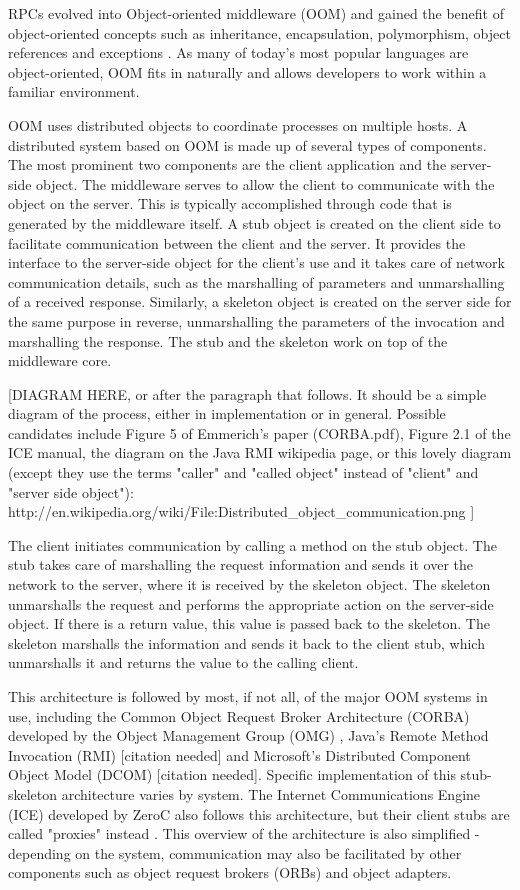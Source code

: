 \documentclass{acm_proc_article-sp}
\begin{document}
RPCs evolved into Object-oriented middleware (OOM) and gained the benefit of object-oriented concepts such as inheritance, encapsulation, polymorphism, object references and exceptions \cite{Pinus:2006p8367} \cite{Vinoski:2004p8371}.  As many of today's most popular languages are object-oriented, OOM fits in naturally and allows developers to work within a familiar environment.

OOM uses distributed objects to coordinate processes on multiple hosts.  A distributed system based on OOM is made up of several types of components.  The most prominent two components are the client application and the server-side object.  The middleware serves to allow the client to communicate with the object on the server.  This is typically accomplished through code that is generated by the middleware itself.  A stub object is created on the client side to facilitate communication between the client and the server.  It provides the interface to the server-side object for the client's use and it takes care of network communication details, such as the marshalling of parameters and unmarshalling of a received response.  Similarly, a skeleton object is created on the server side for the same purpose in reverse, unmarshalling the parameters of the invocation and marshalling the response.  The stub and the skeleton work on top of the middleware core.

[DIAGRAM HERE, or after the paragraph that follows.  It should be a simple diagram of the process, either in implementation or in general.  Possible candidates include Figure 5 of Emmerich's paper (CORBA.pdf), Figure 2.1 of the ICE manual, the diagram on the Java RMI wikipedia page, or this lovely diagram (except they use the terms "caller" and "called object" instead of "client" and "server side object"): http://en.wikipedia.org/wiki/File:Distributed_object_communication.png ]

The client initiates communication by calling a method on the stub object.  The stub takes care of marshalling the request information and sends it over the network to the server, where it is received by the skeleton object.  The skeleton unmarshalls the request and performs the appropriate action on the server-side object.  If there is a return value, this value is passed back to the skeleton.  The skeleton marshalls the information and sends it back to the client stub, which unmarshalls it and returns the value to the calling client.

This architecture is followed by most, if not all, of the major OOM systems in use, including the Common Object Request Broker Architecture (CORBA) developed by the Object Management Group (OMG) \cite{Emmerich:2007p8368}, Java's Remote Method Invocation (RMI) [citation needed] and Microsoft's Distributed Component Object Model (DCOM) [citation needed].  Specific implementation of this stub-skeleton architecture varies by system.  The Internet Communications Engine (ICE) developed by ZeroC also follows this architecture, but their client stubs are called "proxies" instead \cite{icemanual}.  This overview of the architecture is also simplified - depending on the system, communication may also be facilitated by other components such as object request brokers (ORBs) and object adapters.
\end{document}
